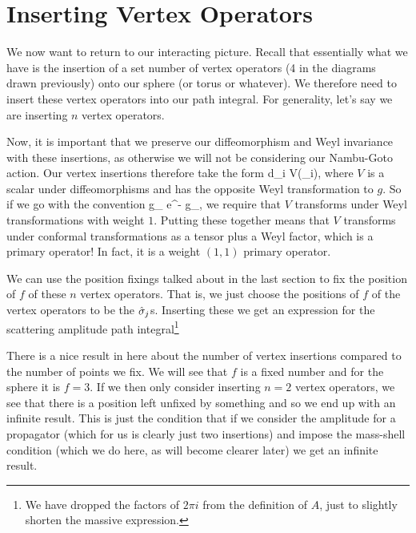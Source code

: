 \section{Inserting Vertex Operators}

We now want to return to our interacting picture. Recall that essentially what we have is the insertion of a set number of vertex operators (4 in the diagrams drawn previously) onto our sphere (or torus or whatever). We therefore need to insert these vertex operators into our path integral. For generality, let's say we are inserting $n$ vertex operators.

Now, it is important that we preserve our diffeomorphism and Weyl invariance with these insertions, as otherwise we will not be considering our Nambu-Goto action. Our vertex insertions therefore take the form 
\bse 
    \int d\sig_i  V(\sig_i),
\ese 
where $V$ is a scalar under diffeomorphisms and has the opposite Weyl transformation to $g$. So if we go with the convention 
\bse 
    g_{\a\beta} \to e^{-\phi} g_{\a\beta},
\ese 
we require that $V$ transforms under Weyl transformations with weight $1$. Putting these together means that $V$ transforms under conformal transformations as a tensor plus a Weyl factor, which is a primary operator! In fact, it is a weight $(1,1)$ primary operator.

We can use the position fixings talked about in the last section to fix the position of $f$ of these $n$ vertex operators. That is, we just choose the positions of $f$ of the vertex operators to be the $\hat{\sigma}_j$s. Inserting these we get an expression for the scattering amplitude path integral\footnote{We have dropped the factors of $2\pi i$ from the definition of $A$, just to slightly shorten the massive expression.}


\br 
    There is a nice result in here about the number of vertex insertions compared to the number of points we fix. We will see that $f$ is a fixed number and for the sphere it is $f=3$. If we then only consider inserting $n=2$ vertex operators, we see that there is a position left unfixed by something and so we end up with an infinite result. This is just the condition that if we consider the amplitude for a propagator (which for us is clearly just two insertions) and impose the mass-shell condition (which we do here, as will become clearer later) we get an infinite result. 
\er 

